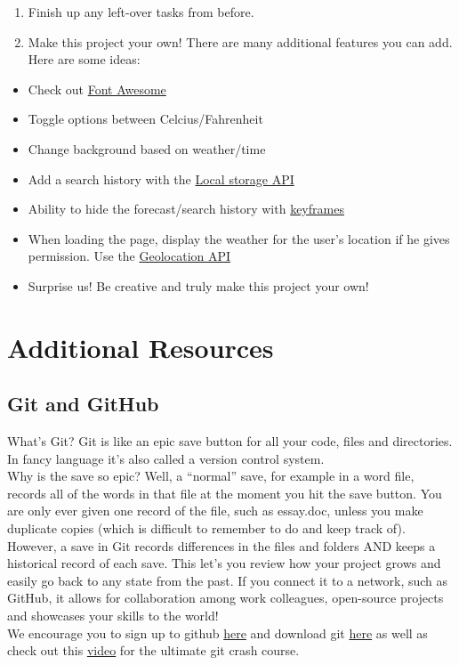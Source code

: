 \documentclass[
]{article}
\providecommand{\tightlist}{%
  \setlength{\itemsep}{0pt}\setlength{\parskip}{0pt}}
\begin{document}
\begin{enumerate}
\def\labelenumi{\arabic{enumi}.}
\tightlist
\item
  Finish up any left-over tasks from before.
\item
  Make this project your own! There are many additional features you can add. Here are some ideas:
\end{enumerate}

\begin{itemize}
\tightlist
\item
  Check out \protect\hyperlink{font-awesome}{Font Awesome}
\item
  Toggle options between Celcius/Fahrenheit
\item
  Change background based on weather/time
\item
  Add a search history with the \href{https://developer.mozilla.org/de/docs/Web/API/Window/localStorage}{Local storage API}
\item
  Ability to hide the forecast/search history with \href{https://developer.mozilla.org/de/docs/Web/CSS/@keyframes}{keyframes}
\item
  When loading the page, display the weather for the user's location if he gives permission. Use the \href{https://developer.mozilla.org/de/docs/Web/API/Geolocation_API}{Geolocation API}
\item
  Surprise us! Be creative and truly make this project your own!
\end{itemize}

\hypertarget{additional-resources}{%
\section{Additional Resources}\label{additional-resources}}

\hypertarget{git-and-github}{%
\subsection{Git and GitHub}\label{git-and-github}}

What's Git? Git is like an epic save button for all your code, files and directories. In fancy language it's also called a version control system.\\
Why is the save so epic? Well, a ``normal'' save, for example in a word file, records all of the words in that file at the moment you hit the save button. You are only ever given one record of the file, such as essay.doc, unless you make duplicate copies (which is difficult to remember to do and keep track of).\\
However, a save in Git records differences in the files and folders AND keeps a historical record of each save. This let's you review how your project grows and easily go back to any state from the past. If you connect it to a network, such as GitHub, it allows for collaboration among work colleagues, open-source projects and showcases your skills to the world!\\
We encourage you to sign up to github \href{https://github.com/}{here} and download git \href{https://git-scm.com/downloads}{here} as well as check out this \href{https://www.youtube.com/watch?v=SWYqp7iY_Tc}{video} for the ultimate git crash course.
\end{document}
